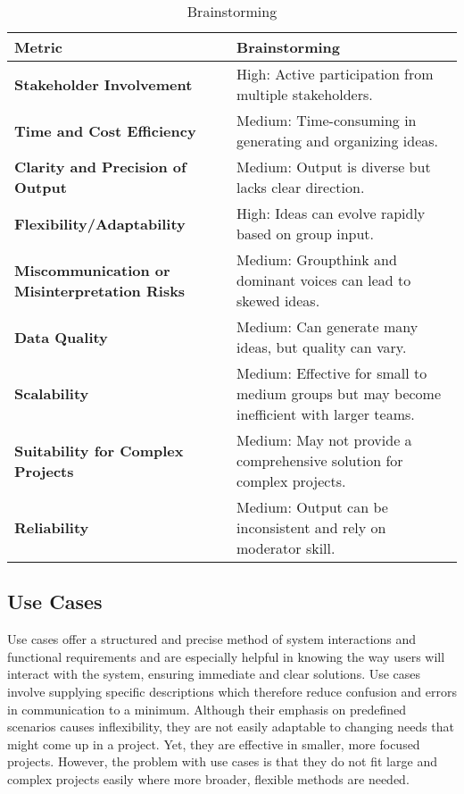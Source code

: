 \documentclass[conference]{IEEEtran}
\begin{document}
\begin{table}[htbp]
\caption{Brainstorming}
\label{tab3}
\centering
\begin{tabular}{|p{4cm}|p{4cm}|}
\hline
\textbf{Metric}                     & \textbf{Brainstorming}                                        \\ \hline
\textbf{Stakeholder Involvement}     & High: Active participation from multiple stakeholders.       \\ \hline
\textbf{Time and Cost Efficiency}    & Medium: Time-consuming in generating and organizing ideas.   \\ \hline
\textbf{Clarity and Precision of Output} & Medium: Output is diverse but lacks clear direction.         \\ \hline
\textbf{Flexibility/Adaptability}    & High: Ideas can evolve rapidly based on group input.         \\ \hline
\textbf{Miscommunication or Misinterpretation Risks} & Medium: Groupthink and dominant voices can lead to skewed ideas. \\ \hline
\textbf{Data Quality}                    & Medium: Can generate many ideas, but quality can vary.       \\ \hline
\textbf{Scalability}                     & Medium: Effective for small to medium groups but may become inefficient with larger teams. \\ \hline
\textbf{Suitability for Complex Projects} & Medium: May not provide a comprehensive solution for complex projects. \\ \hline
\textbf{Reliability}                     & Medium: Output can be inconsistent and rely on moderator skill. \\ \hline
\end{tabular}
\end{table}

\subsection*{Use Cases}
Use cases offer a structured and precise method of system interactions and functional requirements and are especially helpful in knowing the way users will interact with the system, ensuring immediate and clear solutions. Use cases involve supplying specific descriptions which therefore reduce confusion and errors in communication to a minimum. Although their emphasis on predefined scenarios causes inflexibility, they are not easily adaptable to changing needs that might come up in a project. Yet, they are effective in smaller, more focused projects. However, the problem with use cases is that they do not fit large and complex projects easily where more broader, flexible methods are needed.
\end{document}
